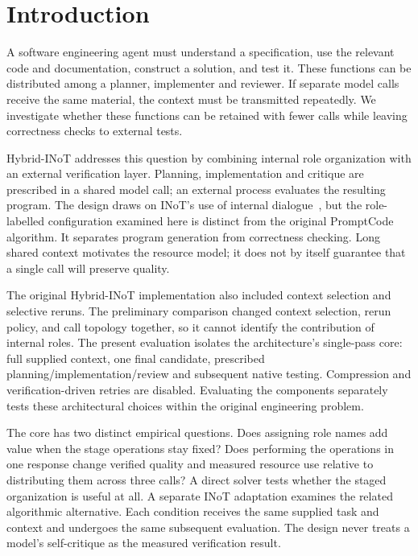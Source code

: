 \section{Introduction}
\label{sec:heldout-context}
A software engineering agent must understand a specification, use the relevant code and documentation, construct a solution, and test it. These functions can be distributed among a planner, implementer and reviewer. If separate model calls receive the same material, the context must be transmitted repeatedly. We investigate whether these functions can be retained with fewer calls while leaving correctness checks to external tests.

Hybrid-INoT addresses this question by combining internal role organization with an external verification layer. Planning, implementation and critique are prescribed in a shared model call; an external process evaluates the resulting program. The design draws on INoT's use of internal dialogue~\cite{sun2025inot}, but the role-labelled configuration examined here is distinct from the original PromptCode algorithm. It separates program generation from correctness checking. Long shared context motivates the resource model; it does not by itself guarantee that a single call will preserve quality.

The original Hybrid-INoT implementation also included context selection and selective reruns. The preliminary comparison changed context selection, rerun policy, and call topology together, so it cannot identify the contribution of internal roles. The present evaluation isolates the architecture's single-pass core: full supplied context, one final candidate, prescribed planning/implementation/review and subsequent native testing. Compression and verification-driven retries are disabled. Evaluating the components separately tests these architectural choices within the original engineering problem.

The core has two distinct empirical questions. Does assigning role names add value when the stage operations stay fixed? Does performing the operations in one response change verified quality and measured resource use relative to distributing them across three calls? A direct solver tests whether the staged organization is useful at all. A separate INoT adaptation examines the related algorithmic alternative. Each condition receives the same supplied task and context and undergoes the same subsequent evaluation. The design never treats a model's self-critique as the measured verification result.

